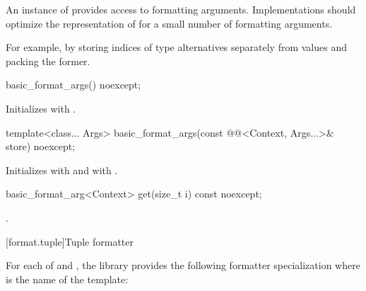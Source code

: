 \pnum
An instance of  provides access to formatting
arguments.
Implementations should
optimize the representation of 
for a small number of formatting arguments.
\begin{note}
For example, by storing indices of type alternatives separately from values
and packing the former.
\end{note}

%
\begin{itemdecl}
basic_format_args() noexcept;
\end{itemdecl}

\begin{itemdescr}
\pnum
\effects
Initializes  with .
\end{itemdescr}

%
\begin{itemdecl}
template<class... Args>
  basic_format_args(const @@<Context, Args...>& store) noexcept;
\end{itemdecl}

\begin{itemdescr}
\pnum
\effects
Initializes
 with  and
 with .
\end{itemdescr}

%
\begin{itemdecl}
basic_format_arg<Context> get(size_t i) const noexcept;
\end{itemdecl}

\begin{itemdescr}
\pnum
\returns
{}.
\end{itemdescr}

[format.tuple]{Tuple formatter}

\pnum
For each of  and ,
the library provides the following formatter specialization
where  is the name of the template:

